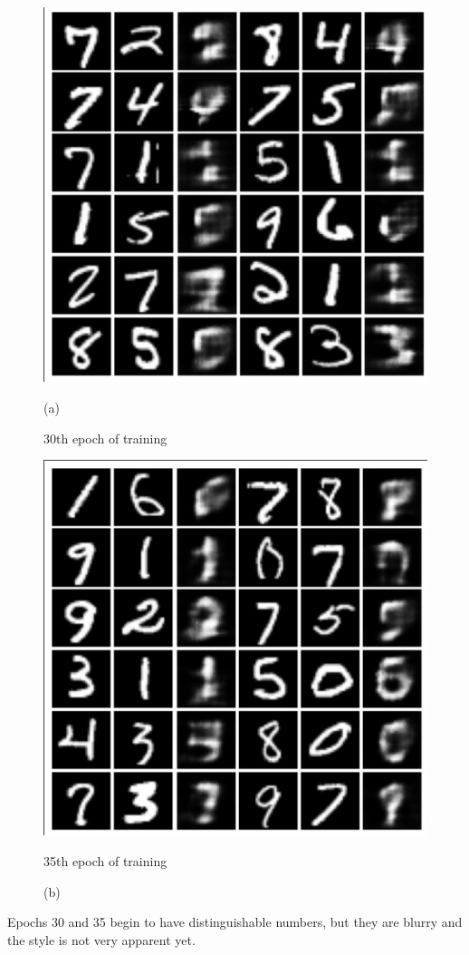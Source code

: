 \documentclass{article}
\begin{document}
\begin{figure}[hbt]
    \centering
    \begin{minipage}{.5\textwidth}
        \centering
        \includegraphics[width=.4\linewidth]{images/EXP7_29.jpg}
        \caption{(a)}{30th epoch of training}
        \label{fig:sub7}
    \end{minipage}%
    \begin{minipage}{.5\textwidth}
        \centering
        \includegraphics[width=.4\linewidth]{images/EXP7_34.jpg}
        \caption{(b)}{35th epoch of training}
        \label{fig:sub8}
    \end{minipage}
\end{figure}

Epochs 30 and 35 begin to have distinguishable numbers, but they are blurry and the style is not 
very apparent yet.
\clearpage
\end{document}
